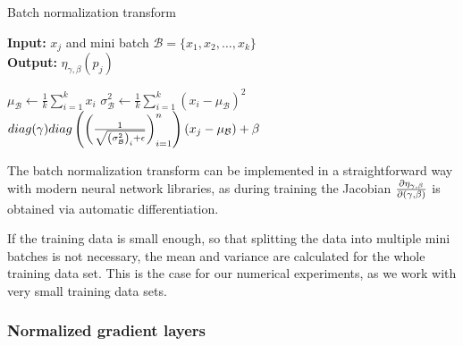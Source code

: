 \documentclass[twoside,a4paper]{article}
\begin{document}
\begin{algorithm}\label{algo_batch_norm}
	\caption{Batch normalization transform}
	\textbf{Input:} $x_j$ and mini batch $\mathcal{B} = \{x_1, x_2, \dots, x_{k}\}$  \\
	\textbf{Output:} $\eta_{\gamma, \beta}(p_j)$
	\begin{algorithmic}
		 
			\State $\mu_\mathcal{B} \gets \frac{1}{k} \sum_{i=1}^{k} x_i$
			\State $\sigma^2_\mathcal{B} \gets \frac{1}{k} \sum_{i=1}^{k} 
			(x_i - \mu_\mathcal{B})^2$
		\EndIf
		\State \Return 
		$diag(\gamma)diag 
		\left( \left( \frac{1}{\sqrt{\left( \sigma^2_\mathcal{B} \right)_i + \epsilon}} \right)_{i=1}^n \right)
		(x_j-\mu_\mathcal{B}) + \beta$
	\end{algorithmic}
\end{algorithm}

The batch normalization transform can be implemented in a straightforward way with modern
neural network libraries, as during training the Jacobian $\frac{\partial \eta_{\gamma, \beta}}{\partial (\gamma, \beta)}$ 
is obtained via automatic differentiation.

If the training data is small enough, so that splitting the data into multiple mini batches
is not necessary, the mean and variance are calculated for the whole training data set. This is the
case for our numerical experiments, as we work with very small training data sets.

\subsubsection{Normalized gradient layers}
\end{document}
